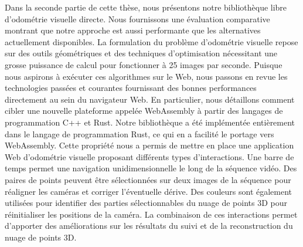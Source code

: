 Dans la seconde partie de cette thèse,
nous présentons notre bibliothèque libre d'odométrie visuelle directe.
Nous fournissons une évaluation comparative montrant que notre approche
est aussi performante que les alternatives actuellement disponibles.
La formulation du problème d'odométrie visuelle
repose sur des outils géométriques et des techniques d'optimisation
nécessitant une grosse puissance de calcul pour fonctionner à 25 images par seconde.
Puisque nous aspirons à exécuter ces algorithmes sur le Web,
nous passons en revue les technologies passées et courantes
fournissant des bonnes performances directement au sein du navigateur Web.
En particulier, nous détaillons comment cibler une nouvelle plateforme appelée WebAssembly
à partir des langages de programmation C++ et Rust.
Notre bibliothèque a été implémentée entièrement dans le langage de programmation Rust,
ce qui en a facilité le portage vers WebAssembly.
Cette propriété nous a permis de mettre en place
une application Web d'odométrie visuelle proposant différents types d'interactions.
Une barre de temps permet une navigation unidimensionnelle le long de la séquence vidéo.
Des paires de points peuvent être sélectionnées sur deux images
de la séquence pour réaligner les caméras et corriger l'éventuelle dérive.
Des couleurs sont également utilisées pour identifier des parties sélectionnables
du nuage de points 3D pour réinitialiser les positions de la caméra.
La combinaison de ces interactions permet d'apporter des améliorations
sur les résultats du suivi et de la reconstruction du nuage de points 3D.
